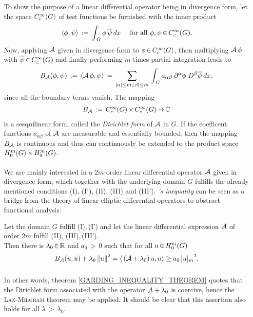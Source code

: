 \documentclass[11pt,twoside]{article}
\def\G{G}
\begin{document}
\subparagraph{}
To show the purpose of a linear differential operator being in divergence form,
let the space $\TF$ of {test functions} be furnished with the inner product
\[
\scalar{\phi}{\psi} \eqdef
\int_{\,\G} \phi \, \overline{\psi} \,dx \qfa \phi,\psi \xeof \TF.
\]
Now,
applying ${\mathcal{A}}$ given in divergence form to $\phi \xeof \TF$,
then multiplying ${\mathcal{A}} \, \phi$ with $\overline{\psi} \xeof \TF$ and
finally performing $m$-times partial integration leads to
\[
\DF_{\A}(\phi,\psi) \eqdef \scalar{\A \, \phi}{\psi} \=
\sum_{\abs{\alpha} \leq m, \abs{\beta} \leq m} \,
\int_{\,\G}
a_{\alpha \beta} \; \PA \phi \; D^{\beta} \overline{\psi}
\, dx,
\]
since all the boundary terms vanish.
The mapping
\[
\DF_{\A} \eqdef \TF \xtimes \TF \xto \C
\]
is a sesquilinear form,
called the \textit{Dirichlet form} of ${\mathcal{A}}$ in $\G$.
If the coefficent functions $a_{\alpha \beta}$ of ${\mathcal{A}}$
are measurable and essentially bounded,
then the mapping $B_{{\mathcal{A}}}$ is continuous
and thus can continuously be extended to the product space
$\HN{m}{\G} \xtimes \HN{m}{\G}$.

\paragraph{} %
We are mainly interested in a $2m$-order linear differential operator ${\mathcal{A}}$
given in divergence form,
which together with the underlying domain $\G$ fulfills the already 
mentioned conditions (I), (I'), (II), (III) and (III').
\textsc{{\GARDING}}\textit{'s inequality} can be seen as a bridge
from the theory of linear-elliptic differential operators
to abstract functional analysis:

\begin{theorem1}\label{GARDING_INEQUALITY_THEOREM}
Let the domain $\G$ fulfill (I),\,(I') 
and let the linear differential expression ${\mathcal{A}}$ of order $2m$ fulfill
(II),\,\,(III),\,(III').\\
Then there is $\lambda_0 {\,\in\,} {\mathbb{R}}$ and $a_0 {\,>\,} 0$ such that
for all $u \xeof \HN{m}{\G}$
\begin{equation}\label{GARDING_INEQUALITY}
\DF_{\A}(u,u) + \lambda_0 \norm{u}^2 =
\scalar{\,(\A+\lambda_0)\,u}{u} \geq a_0 \, {\abs{u} _m}^2.
\end{equation}
\end{theorem1}

\subparagraph{}
In other words,
theorem \ref{GARDING_INEQUALITY_THEOREM} quotes that
the Dirichlet form associated with the operator ${\mathcal{A}} + \lambda_0$ is coercive,
hence the \textsc{Lax-Milgram} theorem may be applied.
It should be clear that this assertion also holds
for all $\lambda {\,>\,} \lambda_0$.
\end{document}
